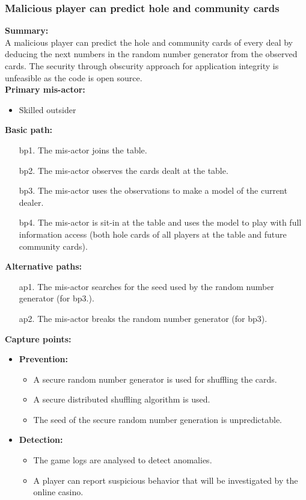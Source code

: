 \documentclass[a4paper,11pt]{report}
\begin{document}
\subsubsection{Malicious player can predict hole and community cards}
\textbf{Summary:} \\
A malicious player can predict the hole and community cards of every deal by deducing the next numbers in the random number generator from the observed cards. The security through obscurity approach for application integrity is unfeasible as the code is open source. \\
\textbf{Primary mis-actor:}
\begin{itemize}
\item Skilled outsider
\end{itemize}
\textbf{Basic path:}
\begin{enumerate}
\item[bp1.] The mis-actor joins the table.
\item[bp2.] The mis-actor observes the cards dealt at the table.
\item[bp3.] The mis-actor uses the observations to make a model of the current dealer.
\item[bp4.] The mis-actor is sit-in at the table and uses the model to play with full information access (both hole cards of all players at the table and future community cards).
\end{enumerate}
\textbf{Alternative paths:}
\begin{itemize}
\item[ap1.] The mis-actor searches for the seed used by the random number generator (for bp3.).
\item[ap2.] The mis-actor breaks the random number generator (for bp3).
\end{itemize}
\textbf{Capture points:}
\begin{itemize}
\item \textbf{Prevention:}
\begin{itemize}
\item A secure random number generator is used for shuffling the cards.
\item A secure distributed shuffling algorithm is used.
\item The seed of the secure random number generation is unpredictable.
\end{itemize}
\item \textbf{Detection:}
\begin{itemize}
\item The game logs are analysed to detect anomalies.
\item A player can report suspicious behavior that will be investigated by the online casino.
\end{itemize}
\end{itemize}
\end{document}
